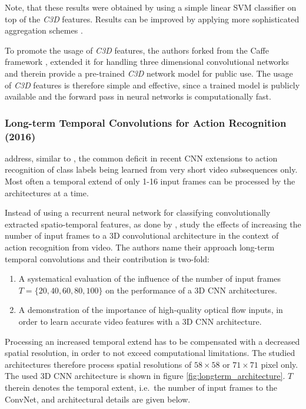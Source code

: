 Note, that these results were obtained by using a simple linear SVM classifier on top of the \textit{C3D} features.
Results can be improved by applying more sophisticated aggregation schemes \cite{tran_learning_2015}.

To promote the usage of \textit{C3D} features, the authors forked from the Caffe framework \cite{jia_caffe:_2014}, extended it for handling three dimensional convolutional networks and therein provide a pre-trained \textit{C3D} network model for public use.
The usage of \textit{C3D} features is therefore simple and effective, since a trained model is publicly available and the forward pass in neural networks is computationally fast.


\subsubsection{Long-term Temporal Convolutions for Action Recognition (2016)}
\textcite{varol_long-term_2016} address, similar to \textcite{baccouche_sequential_2011}, the common deficit in recent CNN extensions to action recognition of class labels being learned from very short video subsequences only.
Most often a temporal extend of only 1-16 input frames can be processed by the architectures at a time. \cite{ji_3d_2013}\cite{karpathy_large-scale_2014}\cite{tran_learning_2015}

Instead of using a recurrent neural network for classifying convolutionally extracted spatio-temporal features, as done by \textcite{baccouche_sequential_2011}, \textcite{varol_long-term_2016} study the effects of increasing the number of input frames to a 3D convolutional architecture in the context of action recognition from video.
The authors name their approach long-term temporal convolutions and their contribution is two-fold:
\begin{enumerate}
    \item A systematical evaluation of the influence of the number of input frames $T = \{20, 40, 60, 80, 100\}$ on the performance of a 3D CNN architectures.  
    \item A demonstration of the importance of high-quality optical flow inputs, in order to learn accurate video features with a 3D CNN architecture.
\end{enumerate}

Processing an increased temporal extend has to be compensated with a decreased spatial resolution, in order to not exceed computational limitations.
The studied architectures therefore process spatial resolutions of $58\times58$ or $71\times71$ pixel only.
The used 3D CNN architecture is shown in figure \ref{fig:longterm_architecture}.
$T$ therein denotes the temporal extent, i.e.\ the number of input frames to the ConvNet, and architectural details are given below.

